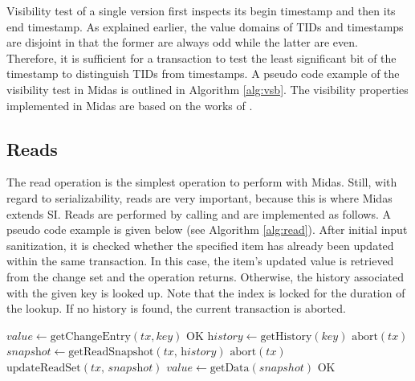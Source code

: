 Visibility test of a single version first inspects its begin timestamp and then its end timestamp. As explained earlier, the value domains of TIDs and timestamps are disjoint in that the former are always odd while the latter are even. Therefore, it is sufficient for a transaction to test the least significant bit of the timestamp to distinguish TIDs from timestamps. A pseudo code example of the visibility test in Midas is outlined in Algorithm \ref{alg:vsb}. The visibility properties implemented in Midas are based on
the works of \cite{berenson1995critique, larson2011high}.



\subsection{Reads}

The read operation is the simplest operation to perform with Midas. Still, with regard to serializability, reads are very important, because this is where Midas extends SI. Reads are performed by calling  and are implemented as follows. A pseudo code example is given below (see Algorithm \ref{alg:read}). After initial input sanitization, it is checked whether the specified item has already been updated within the same transaction. In this case, the item's updated value is retrieved from the change set and the operation returns. Otherwise, the history associated with the given key is looked up. Note that the index is locked for the duration of the lookup. If no history is found, the current transaction is aborted.

\begin{algorithm}[!ht]
\begin{algorithmic}[1]
\State $\textit{value} \gets \text{getChangeEntry}(tx, key)$
\State \Return $\text{OK}$
\EndIf
\State $\textit{history} \gets \text{getHistory}(\textit{key})$
\State \Return $\text{abort}(tx)$
\EndIf
\State $\textit{snapshot} \gets \text{getReadSnapshot}(\textit{tx, history})$
\State \Return $\text{abort}(tx)$
\EndIf
\State $\text{updateReadSet}(\textit{tx, snapshot})$
\State $\textit{value} \gets \text{getData}(snapshot)$
\State \Return $\text{OK}$
\EndProcedure
\end{algorithmic}
\caption{}
\label{alg:read}
\end{algorithm}

